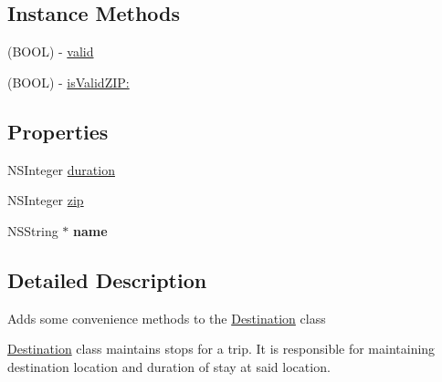 \subsection*{Instance Methods}
\begin{DoxyCompactItemize}
\item 
(B\-O\-O\-L) -\/ \hyperlink{interface_destination_ae33ba4170b0e92f1b94ae6f21f5c3dbb}{valid}
\item 
(B\-O\-O\-L) -\/ \hyperlink{interface_destination_a906246f5d15394fa5d8f5fee672537e1}{is\-Valid\-Z\-I\-P\-:}
\end{DoxyCompactItemize}
\subsection*{Properties}
\begin{DoxyCompactItemize}
\item 
N\-S\-Integer \hyperlink{interface_destination_a83a4c63fc216c137f29aadaa4be1fda2}{duration}
\item 
N\-S\-Integer \hyperlink{interface_destination_ac3fa98f68bc95bf00852743e1b3d3f9a}{zip}
\item 
\hypertarget{interface_destination_ab21be07a3201646736da1899501cb46c}{N\-S\-String $\ast$ {\bfseries name}}\label{interface_destination_ab21be07a3201646736da1899501cb46c}

\end{DoxyCompactItemize}


\subsection{Detailed Description}
Adds some convenience methods to the \hyperlink{interface_destination}{Destination} class

\hyperlink{interface_destination}{Destination} class maintains stops for a trip. It is responsible for maintaining destination location and duration of stay at said location. 

